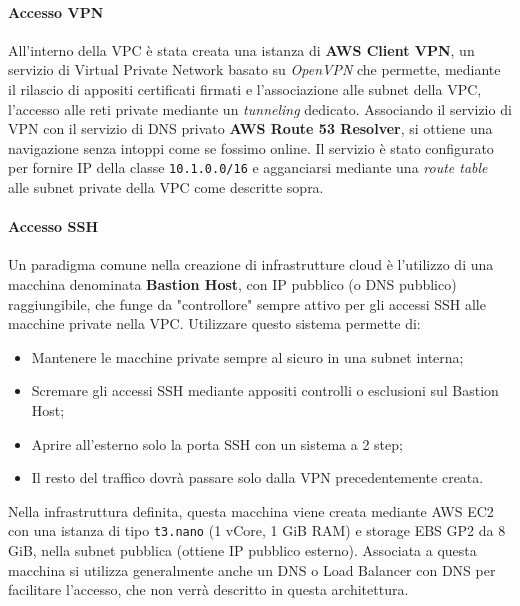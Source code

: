 \documentclass[../main.tex]{subfiles}
\begin{document}
    	    \paragraph{Accesso VPN}
    	    All'interno della VPC è stata creata una istanza di \textbf{AWS Client VPN}, un servizio di Virtual Private Network basato su \emph{OpenVPN} che permette, mediante il rilascio di appositi certificati firmati e l'associazione alle subnet della VPC, l'accesso alle reti private mediante un \emph{tunneling} dedicato. Associando il servizio di VPN con il servizio di DNS privato \textbf{AWS Route 53 Resolver}, si ottiene una navigazione senza intoppi come se fossimo online.
    	    Il servizio è stato configurato per fornire IP della classe \verb|10.1.0.0/16| e agganciarsi mediante una \emph{route table} alle subnet private della VPC come descritte sopra.
    	    
    	    \paragraph{Accesso SSH}
    	    Un paradigma comune nella creazione di infrastrutture cloud è l'utilizzo di una macchina denominata \textbf{Bastion Host}, con IP pubblico (o DNS pubblico) raggiungibile, che funge da "controllore" sempre attivo per gli accessi SSH alle macchine private nella VPC. Utilizzare questo sistema permette di:
    	    \begin{itemize}
    	        \item Mantenere le macchine private sempre al sicuro in una subnet interna;
    	        \item Scremare gli accessi SSH mediante appositi controlli o esclusioni sul Bastion Host;
    	        \item Aprire all'esterno solo la porta SSH con un sistema a 2 step;
    	        \item Il resto del traffico dovrà passare solo dalla VPN precedentemente creata.
    	    \end{itemize}
    	    Nella infrastruttura definita, questa macchina viene creata mediante AWS EC2 con una istanza di tipo \verb|t3.nano| (1 vCore, 1 GiB RAM) e storage EBS GP2 da 8 GiB, nella subnet pubblica (ottiene IP pubblico esterno). Associata a questa macchina si utilizza generalmente anche un DNS o Load Balancer con DNS per facilitare l'accesso, che non verrà descritto in questa architettura.
    	    
\end{document}
